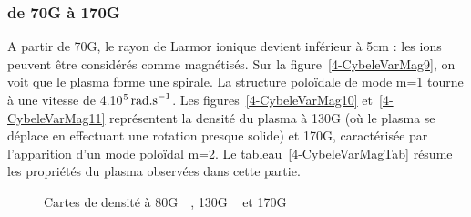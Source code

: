 \begin{refsection}
\subsubsection{de 70G à 170G}
A partir de 70G, le rayon de Larmor ionique devient inférieur à 5cm : les ions
peuvent être considérés comme magnétisés.
Sur la figure~\ref{4-CybeleVarMag9}, on voit que le
plasma forme une spirale. La structure poloïdale de mode m=1 tourne à une
vitesse de 4.10$^{{5}}\,\text{rad.s}^{{-1}}$. Les
figures~\ref{4-CybeleVarMag10} et~\ref{4-CybeleVarMag11} représentent la densité
du plasma à 130G (où le plasma se déplace en effectuant une rotation presque
solide) et 170G, caractérisée par l'apparition d'un mode poloïdal m=2. 
Le tableau~\ref{4-CybeleVarMagTab} résume les propriétés du plasma observées
dans cette partie.
\begin{figure}[!htbp]
  \centering
    \caption{Cartes de densité à 80G~~, 130G
    ~ et 170G }
    \label{4-CybeleVarMag-3}
\end{figure}



\end{refsection}
